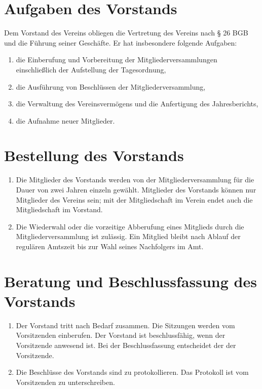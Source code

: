 \section{Aufgaben des Vorstands}
Dem Vorstand des Vereins obliegen die Vertretung des Vereins nach § 26 BGB und
die Führung seiner Geschäfte. Er hat insbesondere folgende Aufgaben:
\begin{enumerate}[label=\alph*)]
    \item die Einberufung und Vorbereitung der Mitgliederversammlungen
        einschließlich der Aufstellung der Tagesordnung,
    \item die Ausführung von Beschlüssen der Mitgliederversammlung,
    \item die Verwaltung des Vereinsvermögens und die Anfertigung des Jahresberichts,
    \item die Aufnahme neuer Mitglieder.
\end{enumerate}

\section{Bestellung des Vorstands}
\begin{enumerate}[label=(\arabic*)]
    \item Die Mitglieder des Vorstands werden von der Mitgliederversammlung für
        die Dauer von zwei Jahren einzeln gewählt. Mitglieder des Vorstands
        können nur Mitglieder des Vereins sein; mit der Mitgliedschaft im
        Verein endet auch die Mitgliedschaft im Vorstand.
    \item Die Wiederwahl oder die vorzeitige Abberufung eines Mitglieds durch
        die Mitgliederversammlung ist zulässig. Ein Mitglied bleibt nach Ablauf
        der regulären Amtszeit bis zur Wahl seines Nachfolgers im Amt.
\end{enumerate}

\section{Beratung und Beschlussfassung des Vorstands}
\begin{enumerate}[label=(\arabic*)]
    \item Der Vorstand tritt nach Bedarf zusammen. Die Sitzungen werden vom
        Vorsitzenden einberufen. Der Vorstand ist beschlussfähig, wenn der
        Vorsitzende anwesend ist. Bei der Beschlussfassung entscheidet der
        der Vorsitzende.
    \item Die Beschlüsse des Vorstands sind zu protokollieren. Das Protokoll
        ist vom Vorsitzenden zu unterschreiben.
\end{enumerate}

